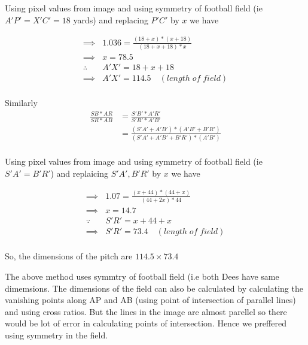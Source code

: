 \documentclass[a4paper]{article}
\begin{document}
Using pixel values from image and using symmetry of football field (ie $A'P' = X'C' = 18$ yards) and replacing $P'C'$ by $x$ we have

\begin{equation*} 
\begin{split}
\implies & 1.036 = \frac{(18+x)*(x+18)}{(18+x+18)*x}\\
\implies & x = 78.5\\
\therefore \quad & A'X' = 18+x+18 \\
\implies & A'X' =  114.5 \quad (length \; of \; field)\\
 \end{split}
\end{equation*}

Similarly
\begin{equation*} 
\begin{split}
 \frac{SB*AR}{SR*AB} &= \frac{S'B'*A'R'}{S'R'*A'B'} \\
\ &= \frac{(S'A'+A'B')*(A'B'+B'R')}{(S'A'+A'B'+B'R')*(A'B')} \\
 \end{split}
\end{equation*}

Using pixel values from image and using symmetry of football field (ie $S'A' = B'R'$) and replaicing $S'A',B'R'$ by $x$  we have

\begin{equation*} 
\begin{split}
\implies & 1.07 = \frac{(x+44)*(44+x)}{(44+2x)*44}\\
\implies & x = 14.7\\
\because \quad & S'R' = x+44+x \\
\implies & S'R' = 73.4 \quad (length \; of \; field)\\
 \end{split}
\end{equation*}

So, the dimensions of the pitch are $114.5 \times 73.4$

The above method uses symmtry of football field (i.e both Dees have same dimemsions. The dimensions of the field can also be calculated by calculating the vanishing points along AP and AB (using point of intersection of parallel lines) and using cross ratios. But the lines in the image are almost parellel so there would be lot of error in calculating points of intersection. Hence we preffered using symmetry in the field.

\hrulefill \\
\end{document}
